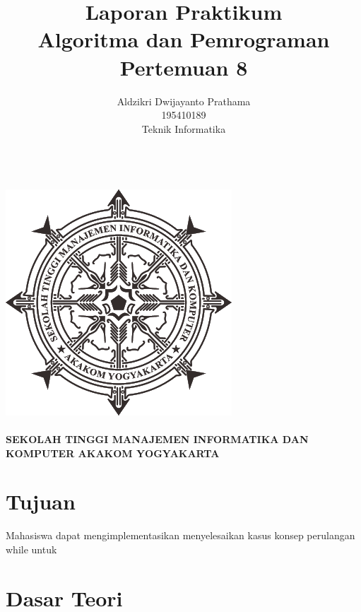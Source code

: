 \documentclass[a4paper,12pt]{article}
\begin{document}
\title{ {\Large Laporan Praktikum}\\ Algoritma dan Pemrograman \\{\Large Pertemuan 8}}

\author{Aldzikri Dwijayanto Prathama 
	\\195410189
	\\Teknik Informatika}
\makeatletter
\begin{titlepage}
	\begin{center}
		{\huge \bfseries \@title }\\[14ex]
		\includegraphics[scale=.8]{logo}\\[4ex]
		{\large \@author}\\[19ex]
		{\large \bfseries {SEKOLAH TINGGI MANAJEMEN INFORMATIKA DAN KOMPUTER
				AKAKOM YOGYAKARTA}}
	\end{center}


\end{titlepage}
\makeatother
\newpage
\tableofcontents
\newpage

\section{Tujuan}
Mahasiswa dapat mengimplementasikan menyelesaikan kasus konsep perulangan while untuk
\section{Dasar Teori}
\end{document}
